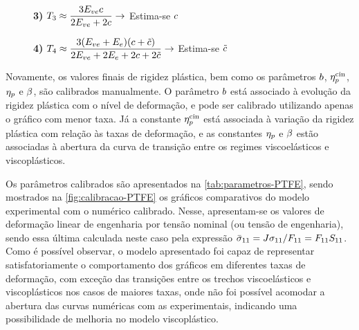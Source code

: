 \documentclass[Tese.tex]{subfiles}
\begin{document}
{\begin{figure}[!htb]
\begin{multicols}{2}
		\vspace{0.35cm}
		
		\textbf{3)} $T_3 \approx \dfrac{3E_{ve}c}{2E_{ve}+2c} \rightarrow $ Estima-se $c$ 
		
		\vspace{0.35cm}
		
		\textbf{4)} $T_4 \approx \dfrac{3(E_{ve}+E_e)(c+\tilde{c})}{2E_{ve}+2E_e+2c+2\tilde{c}} \rightarrow $ Estima-se $\tilde{c}$ 
	\end{multicols}
\end{figure}

Novamente, os valores finais de rigidez plástica, bem como os parâmetros $b$, $\eta_{p}^\text{cin}$, $\eta_{p}$ e $\beta$, são calibrados manualmente. O parâmetro $b$ está associado à evolução da rigidez plástica com o nível de deformação, e pode ser calibrado utilizando apenas o gráfico com menor taxa. Já a constante $\eta_{p}^\text{cin}$ está associada à variação da rigidez plástica com relação às taxas de deformação, e as constantes $\eta_{p}$ e $\beta$ estão associadas à abertura da curva de transição entre os regimes viscoelásticos e viscoplásticos.

Os parâmetros calibrados são apresentados na \autoref{tab:parametros-PTFE}, sendo mostrados na \autoref{fig:calibracao-PTFE} os gráficos comparativos do modelo experimental com o numérico calibrado. Nesse, apresentam-se os valores de deformação linear de engenharia por tensão nominal (ou tensão de engenharia), sendo essa última calculada neste caso pela expressão $\bar{{\sigma}}_{11} = {J}{\sigma}_{11}/{F_{11}} = F_{11}{S}_{11}$. Como é possível observar, o modelo apresentado foi capaz de representar satisfatoriamente o comportamento dos gráficos em diferentes taxas de deformação, com exceção das transições entre os trechos viscoelásticos e viscoplásticos nos casos de maiores taxas, onde não foi possível acomodar a abertura das curvas numéricas com as experimentais, indicando uma possibilidade de melhoria no modelo viscoplástico.

}
\end{document}
